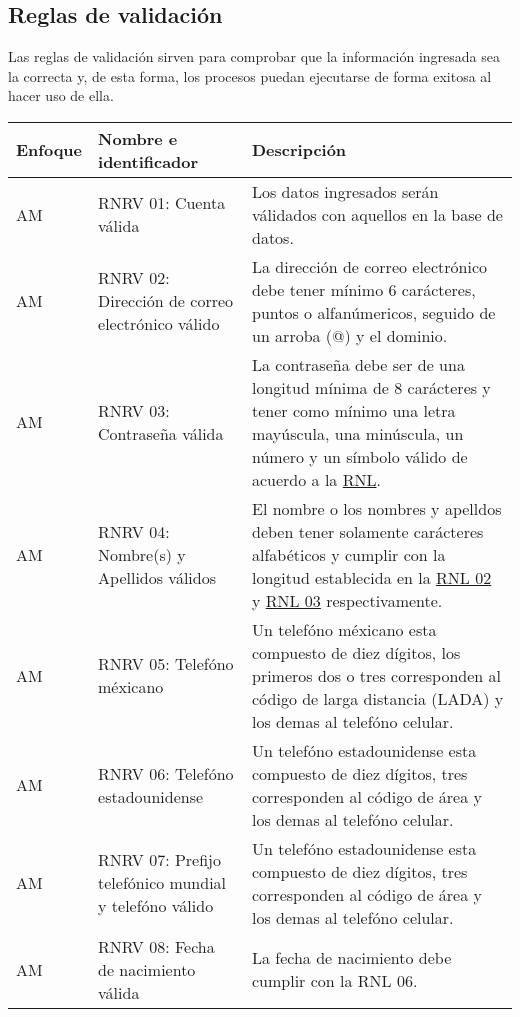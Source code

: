 \subsection{Reglas de validación}
Las reglas de validación sirven para comprobar que la información ingresada sea la correcta y, de esta forma, los procesos puedan ejecutarse de forma exitosa al hacer uso de ella.
  \begin{center}
   \begin{tabular}{|p{1.5cm}|p{4cm}|p{7cm}|}
     \hline
       \textbf{Enfoque}&\textbf{Nombre e identificador} & \textbf{Descripción} \\ \hline
       \label{rnrv_01} AM & RNRV 01: Cuenta válida & Los datos ingresados serán válidados con aquellos en la base de datos. \\ \hline
       \label{rnrv_02} AM & RNRV 02: Dirección de correo electrónico válido &  La dirección de correo electrónico debe tener mínimo 6 carácteres, puntos o alfanúmericos, seguido de un arroba (@) y el dominio. \\ \hline
       \label{rnrv_03} AM & RNRV 03: Contraseña válida &  La contraseña debe ser de una longitud mínima de 8 carácteres y tener como mínimo una letra mayúscula, una minúscula, un número y un símbolo válido de acuerdo a la \hyperref[rnl_01]{RNL}. \\ \hline
       \label{rnrv_04} AM & RNRV 04: Nombre(s) y Apellidos válidos &  El nombre o los nombres y apelldos deben tener solamente carácteres alfabéticos y cumplir con la longitud establecida en la \hyperref[rnl_02]{RNL 02} y \hyperref[rnl_02]{RNL 03} respectivamente. \\ \hline
       \label{rnrv_05} AM & RNRV 05: Telefóno méxicano & Un telefóno méxicano esta compuesto de diez dígitos, los primeros dos o tres corresponden al código de larga distancia (LADA) y los demas al telefóno celular.  \\ \hline
       \label{rnrv_06} AM & RNRV 06: Telefóno estadounidense & Un telefóno estadounidense esta compuesto de diez dígitos, tres corresponden al código de área y los demas al telefóno celular.  \\ \hline
       \label{rnrv_07} AM & RNRV 07: Prefijo telefónico mundial y telefóno válido & Un telefóno estadounidense esta compuesto de diez dígitos, tres corresponden al código de área y los demas al telefóno celular.  \\ \hline
       \label{rnrv_08} AM & RNRV 08: Fecha de nacimiento válida & La fecha de nacimiento debe cumplir con la RNL 06.  \\ \hline
   \end{tabular}
       \label{tab:rnrv}
 \end{center}
 
